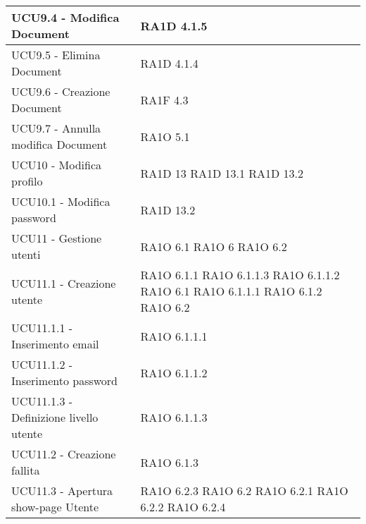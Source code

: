 \begin{center}
\begin{longtable}{ | p{5cm} | p{5cm} |}
            UCU9.4 - Modifica Document &  RA1D 4.1.5 \newline  \\ \hline      
            UCU9.5 - Elimina Document &  RA1D 4.1.4  \newline  \\ \hline      
            UCU9.6 - Creazione Document &  RA1F 4.3 \newline  \\ \hline      
            UCU9.7 - Annulla modifica Document &  RA1O 5.1 \newline  \\ \hline      
            UCU10 - Modifica profilo &  RA1D 13 \newline  RA1D 13.1 \newline  RA1D 13.2 \newline  \\ \hline      
            UCU10.1 - Modifica password &  RA1D 13.2 \newline  \\ \hline      
            UCU11 - Gestione utenti &  RA1O 6.1  \newline  RA1O 6 \newline  RA1O 6.2  \newline  \\ \hline      
            UCU11.1 - Creazione utente &  RA1O 6.1.1  \newline  RA1O 6.1.1.3  \newline  RA1O 6.1.1.2 \newline  RA1O 6.1  \newline  RA1O 6.1.1.1  \newline  RA1O 6.1.2  \newline  RA1O 6.2  \newline  \\ \hline      
            UCU11.1.1 - Inserimento email &  RA1O 6.1.1.1  \newline  \\ \hline      
            UCU11.1.2 - Inserimento password &  RA1O 6.1.1.2 \newline  \\ \hline      
            UCU11.1.3 - Definizione livello utente &  RA1O 6.1.1.3  \newline  \\ \hline      
            UCU11.2 - Creazione fallita &  RA1O 6.1.3  \newline  \\ \hline      
            UCU11.3 - Apertura show-page Utente &  RA1O 6.2.3 \newline  RA1O 6.2  \newline  RA1O 6.2.1 \newline  RA1O 6.2.2 \newline  RA1O 6.2.4 \newline  \\ \hline      

\end{longtable}
\end{center}
